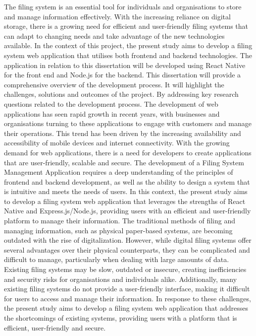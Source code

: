 The filing system is an essential tool for individuals and organisations to store and manage information effectively. With the increasing reliance on digital storage, there is a growing need for efficient and user-friendly filing systems that can adapt to changing needs and take advantage of the new technologies available. In the context of this project, the present study aims to develop a filing system web application that utilises both frontend and backend technologies. The application in relation to this dissertation will be developed using React Native for the front end and Node.js for the backend. This dissertation will provide a comprehensive overview of the development process. It will highlight the challenges, solutions and outcomes of the project. By addressing key research questions related to the development process. 
\newline \newline
The development of web applications has seen rapid growth in recent years, with businesses and organisations turning to these applications to engage with customers and manage their operations. This trend has been driven by the increasing availability and accessibility of mobile devices and internet connectivity. 
\newline \newline
With the growing demand for web applications, there is a need for developers to create applications that are user-friendly, scalable and secure. The development of a Filing System Management Application requires a deep understanding of the principles of frontend and backend development, as well as the ability to design a system that is intuitive and meets the needs of users. In this context, the present study aims to develop a filing system web application that leverages the strengths of React Native and Express.js/Node.js, providing users with an efficient and user-friendly platform to manage their information.
\newline \newline
The traditional methods of filing and managing information, such as physical paper-based systems, are becoming outdated with the rise of digitalization. However, while digital filing systems offer several advantages over their physical counterparts, they can be complicated and difficult to manage, particularly when dealing with large amounts of data. Existing filing systems may be slow, outdated or insecure, creating inefficiencies and security risks for organisations and individuals alike. Additionally, many existing filing systems do not provide a user-friendly interface, making it difficult for users to access and manage their information. In response to these challenges, the present study aims to develop a filing system web application that addresses the shortcomings of existing systems, providing users with a platform that is efficient, user-friendly and secure.
